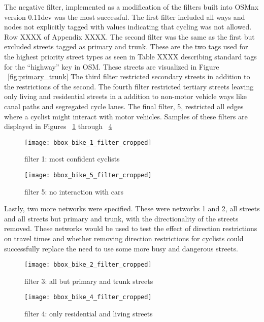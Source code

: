 The negative filter, implemented as a modification of the filters built into OSMnx version 0.11dev was the most successful. The first filter included all ways and nodes not explicitly tagged with values indicating that cycling was not allowed. Row XXXX of Appendix XXXX. The second filter was the same as the first but excluded streets tagged as primary and trunk. These are the two tags used for the highest priority street types as seen in Table XXXX describing standard tags for the ``highway'' key in OSM. These streets are visualized in Figure ~\ref{fig:primary_trunk} The third filter restricted secondary streets in addition to the restrictions of the second. The fourth filter restricted tertiary streets leaving only living and residential streets in a addition to non-motor vehicle ways like canal paths and segregated cycle lanes. The final filter, 5, restricted all edges where a cyclist might interact with motor vehicles. Samples of these filters are displayed in Figures ~\ref{fig:sub1} through ~\ref{fig:sub4}

\begin{figure}
  \centering
  \texttt{[image: bbox\_bike\_1\_filter\_cropped]}
  \caption{filter 1: most confident cyclists}
  \label{fig:sub1}
\end{figure}

\begin{figure}
  \centering
  \texttt{[image: bbox\_bike\_5\_filter\_cropped]}
  \caption{filter 5: no interaction with cars }
  \label{fig:sub2}
\end{figure}

Lastly, two more networks were specified. These were networks 1 and 2, all streets and all streets but primary and trunk, with the directionality of the streets removed. These networks would be used to test the effect of direction restrictions on travel times and whether removing direction restrictions for cyclists could successfully replace the need to use some more busy and dangerous streets. 

\begin{figure}
  \centering
  \texttt{[image: bbox\_bike\_2\_filter\_cropped]}
  \caption{filter 3: all but primary and trunk streets}
  \label{fig:sub3}
\end{figure}



\begin{figure}
  \centering
  \texttt{[image: bbox\_bike\_4\_filter\_cropped]}
  \caption{filter 4: only residential and living streets}
  \label{fig:sub4}
\end{figure}

